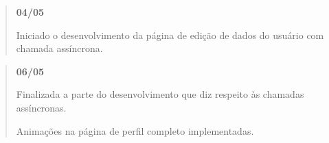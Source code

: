 \begin{quotation}
{\bfseries 04/05}
\begin{DoxyItemize}
\item Iniciado o desenvolvimento da página de edição de dados do usuário com chamada assíncrona.
\end{DoxyItemize}

\end{quotation}


\begin{quotation}
{\bfseries 06/05}
\begin{DoxyItemize}
\item Finalizada a parte do desenvolvimento que diz respeito às chamadas assíncronas.
\item Animações na página de perfil completo implementadas. 
\end{DoxyItemize}\end{quotation}
